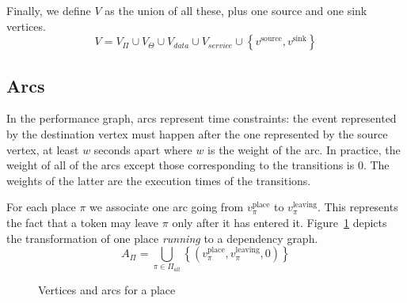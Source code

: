 Finally, we define $V$ as the union of all these, plus one source
and one sink vertices. 
\[
V=V_{\Pi}\cup V_{\Theta}\cup V_{data}\cup V_{service}\cup\left\{ v^\text{source},v^\text{sink}\right\} 
\]


\subsection{Arcs}

In the performance graph, arcs represent time constraints: the event represented
by the destination vertex must happen after the one represented by the source
vertex, at least $w$ seconds apart where $w$ is the weight of the arc. In
practice, the weight of all of the arcs except those corresponding to the
transitions is 0. The weights of the latter are the execution times of the
transitions.

For each place $\pi$ we associate one arc going from $v_\pi^\text{place}$ to
$v_\pi^\text{leaving}$. This represents the fact that a token may leave $\pi$
only after it has entered it.
Figure~\ref{fig:place_graph} depicts the transformation of one place
\emph{running} to a dependency graph.
\[
A_{\Pi}=\bigcup_{\pi\in\Pi_{all}}\left\{ \left(v_\pi^\text{place},v_\pi^\text{leaving},0\right)\right\} 
\]

\begin{figure}[h]
  \caption{Vertices and arcs for a place}
  \label{fig:place_graph}
\end{figure}

